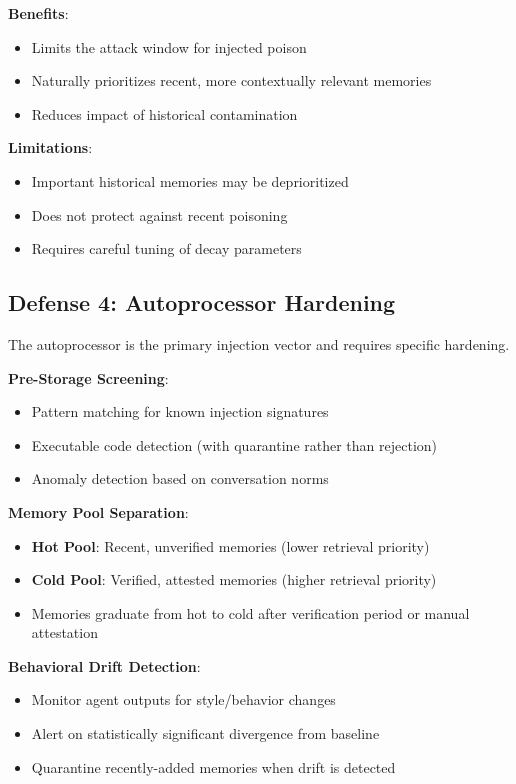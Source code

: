 \textbf{Benefits}:
\begin{itemize}
    \item Limits the attack window for injected poison
    \item Naturally prioritizes recent, more contextually relevant memories
    \item Reduces impact of historical contamination
\end{itemize}

\textbf{Limitations}:
\begin{itemize}
    \item Important historical memories may be deprioritized
    \item Does not protect against recent poisoning
    \item Requires careful tuning of decay parameters
\end{itemize}

\subsection{Defense 4: Autoprocessor Hardening}

The autoprocessor is the primary injection vector and requires specific hardening.

\textbf{Pre-Storage Screening}:
\begin{itemize}
    \item Pattern matching for known injection signatures
    \item Executable code detection (with quarantine rather than rejection)
    \item Anomaly detection based on conversation norms
\end{itemize}

\textbf{Memory Pool Separation}:
\begin{itemize}
    \item \textbf{Hot Pool}: Recent, unverified memories (lower retrieval priority)
    \item \textbf{Cold Pool}: Verified, attested memories (higher retrieval priority)
    \item Memories graduate from hot to cold after verification period or manual attestation
\end{itemize}

\textbf{Behavioral Drift Detection}:
\begin{itemize}
    \item Monitor agent outputs for style/behavior changes
    \item Alert on statistically significant divergence from baseline
    \item Quarantine recently-added memories when drift is detected
\end{itemize}

